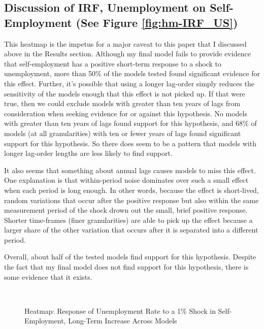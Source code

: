 \documentclass[]{ecca}
\begin{document}
\subsection{Discussion of IRF, Unemployment on Self-Employment (See Figure \ref{fig:hm-IRF_US})}
This heatmap is the impetus for a major caveat to this paper that I discussed above in the Results section. Although my final model fails to provide evidence that self-employment has a positive short-term response to a shock to unemployment, more than 50\% of the models tested found significant evidence for this effect. Further, it's possible that using a longer lag-order simply reduces the sensitivity of the models enough that this effect is not picked up. If that were true, then we could exclude models with greater than ten years of lags from consideration when seeking evidence for or against this hypothesis. No models with greater than ten years of lags found support for this hypothesis, and 68\% of models (at all granularities) with ten or fewer years of lags found significant support for this hypothesis. So there does seem to be a pattern that models with longer lag-order lengths are less likely to find support.

It also seems that something about annual lags causes models to miss this effect. One explanation is that within-period noise dominates over such a small effect when each period is long enough. In other words, because the effect is short-lived, random variations that occur after the positive response but also within the same measurement period of the shock drown out the small, brief positive response. Shorter time-frames (finer granularities) are able to pick up the effect because a larger share of the other variation that occurs after it is separated into a different period. 

Overall, about half of the tested models find support for this hypothesis. Despite the fact that my final model does not find support for this hypothesis, there is some evidence that it exists.


\begin{figure}[!h]
	\centering
	\medskip\\
	\caption{Heatmap: Response of Unemployment Rate to a 1\% Shock in Self-Employment, Long-Term Increase Across Models}
	\label{fig:hm-IRF_SUI}
\end{figure}
\end{document}

